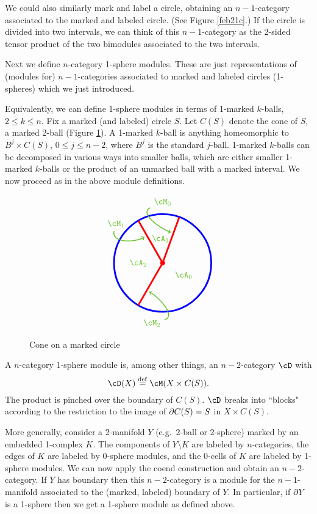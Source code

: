 We could also similarly mark and label a circle, obtaining an $n{-}1$-category
associated to the marked and labeled circle.
(See Figure \ref{feb21c}.)
If the circle is divided into two intervals, we can think of this $n{-}1$-category
as the 2-sided tensor product of the two bimodules associated to the two intervals.

\medskip

Next we define $n$-category 1-sphere modules.
These are just representations of (modules for) $n{-}1$-categories associated to marked and labeled 
circles (1-spheres) which we just introduced.

Equivalently, we can define 1-sphere modules in terms of 1-marked $k$-balls, $2\le k\le n$.
Fix a marked (and labeled) circle $S$.
Let $C(S)$ denote the cone of $S$, a marked 2-ball (Figure \ref{feb21d}).
A 1-marked $k$-ball is anything homeomorphic to $B^j \times C(S)$, $0\le j\le n-2$, 
where $B^j$ is the standard $j$-ball.
1-marked $k$-balls can be decomposed in various ways into smaller balls, which are either 
smaller 1-marked $k$-balls or the product of an unmarked ball with a marked interval.
We now proceed as in the above module definitions.

\begin{figure}[!ht]
$$
\begin{tikzpicture}[baseline,line width = 2pt]
\draw[blue] (0,0) circle (2);
\fill[red] (0,0) circle (0.1);
\foreach \qm/\qa/\n in {70/-30/0, 120/95/1, -120/180/2} {
	\draw[red] (0,0) -- (\qm:2);
	\path (\qa:1) node {\color{green!50!brown} $\cA_\n$};
	\path (\qm+20:2.5) node(M\n) {\color{green!50!brown} $\cM_\n$};
	\draw[line width=1pt, green!50!brown, ->] (M\n.\qm+135) to[out=\qm+135,in=\qm+90] (\qm+5:1.3);
}
\end{tikzpicture}
$$
\caption{Cone on a marked circle}
\label{feb21d}
\end{figure}

A $n$-category 1-sphere module is, among other things, an $n{-}2$-category $\cD$ with
\[
	\cD(X) \deq \cM(X\times C(S)) .
\]
The product is pinched over the boundary of $C(S)$.
$\cD$ breaks into ``blocks" according to the restriction to the 
image of $\partial C(S) = S$ in $X\times C(S)$.

More generally, consider a 2-manifold $Y$ 
(e.g.\ 2-ball or 2-sphere) marked by an embedded 1-complex $K$.
The components of $Y\setminus K$ are labeled by $n$-categories, 
the edges of $K$ are labeled by 0-sphere modules, 
and the 0-cells of $K$ are labeled by 1-sphere modules.
We can now apply the coend construction and obtain an $n{-}2$-category.
If $Y$ has boundary then this $n{-}2$-category is a module for the $n{-}1$-manifold
associated to the (marked, labeled) boundary of $Y$.
In particular, if $\partial Y$ is a 1-sphere then we get a 1-sphere module as defined above.

